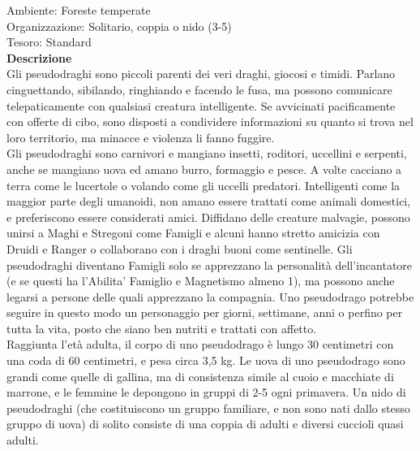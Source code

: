\begin{multicols}{2}
Ambiente: Foreste temperate\\
Organizzazione: Solitario, coppia o nido (3-5)\\
Tesoro: Standard\\
\textbf{Descrizione}\\
Gli pseudodraghi sono piccoli parenti dei veri draghi, giocosi e timidi. Parlano cinguettando, sibilando, ringhiando e facendo le fusa, ma possono comunicare telepaticamente con qualsiasi creatura intelligente. Se avvicinati pacificamente con offerte di cibo, sono disposti a condividere informazioni su quanto si trova nel loro territorio, ma minacce e violenza li fanno fuggire.\\

Gli pseudodraghi sono carnivori e mangiano insetti, roditori, uccellini e serpenti, anche se mangiano uova ed amano burro, formaggio e pesce. A volte cacciano a terra come le lucertole o volando come gli uccelli predatori. Intelligenti come la maggior parte degli umanoidi, non amano essere trattati come animali domestici, e preferiscono essere considerati amici. Diffidano delle creature malvagie, possono unirsi a Maghi e Stregoni come Famigli e alcuni hanno stretto amicizia con Druidi e Ranger o collaborano con i draghi buoni come sentinelle. Gli pseudodraghi diventano Famigli solo se apprezzano la personalità dell’incantatore (e se questi ha l'Abilita' Famiglio e Magnetismo almeno 1), ma possono anche legarsi a persone delle quali apprezzano la compagnia. Uno pseudodrago potrebbe seguire in questo modo un personaggio per giorni, settimane, anni o perfino per tutta la vita, posto che siano ben nutriti e trattati con affetto.\\

Raggiunta l’età adulta, il corpo di uno pseudodrago è lungo 30 centimetri con una coda di 60 centimetri, e pesa circa 3,5 kg. Le uova di uno pseudodrago sono grandi come quelle di gallina, ma di consistenza simile al cuoio e macchiate di marrone, e le femmine le depongono in gruppi di 2-5 ogni primavera. Un nido di pseudodraghi (che costituiscono un gruppo familiare, e non sono nati dallo stesso gruppo di uova) di solito consiste di una coppia di adulti e diversi cuccioli quasi adulti.\\



\end{multicols}
